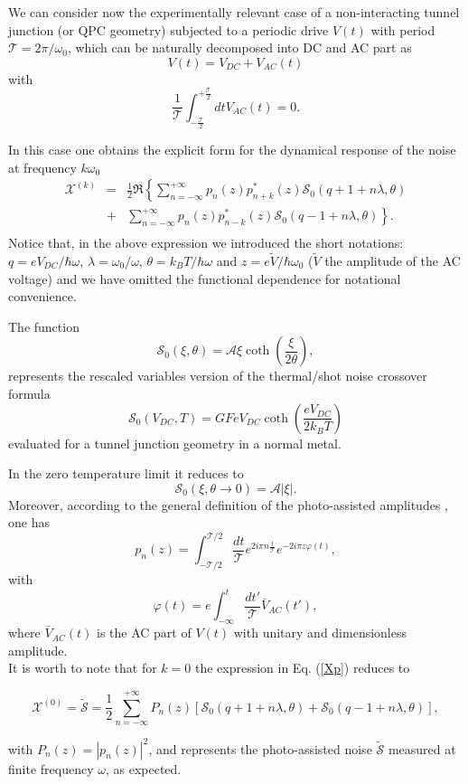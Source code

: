 \documentclass[twocolumn,showpacs,preprintnumbers,amsmath,amssymb%
 aps,
 prb,
 lengthcheck,%
]{revtex4-1}
\def\be{\begin{equation}}
\def\ee{\end{equation}}
\def\beq{\begin{eqnarray}}
\def\eeq{\end{eqnarray}}
\begin{document}
We can consider now the experimentally relevant case of a non-interacting tunnel junction (or QPC geometry) subjected to a periodic drive $V(t)$ with period $\mathcal{T}=2 \pi /\omega_{0}$, which can be naturally decomposed into DC and AC part as 
\be
V(t)=V_{DC}+V_{AC}(t)
\ee
with 
\begin{equation}
\frac{1}{\mathcal{T}}\int^{+\frac{\mathcal{T}}{2}}_{-\frac{\mathcal{T}}{2}} dt V_{AC}(t)=0.
\end{equation}

In this case one obtains the explicit form for the dynamical response of the noise at frequency $k \omega_{0}$ 
\beq
\mathcal{X}^{(k)}&=&\frac{1}{2} \Re\left\{\sum_{n=-\infty}^{+\infty} p_{n}(z) p^{*}_{n+k}(z) \mathcal{S}_{0}(q+1+n\lambda, \theta) \right.\nonumber\\
&+&\left.  \sum_{n=-\infty}^{+\infty} p_{n}(z) p^{*}_{n-k}(z) \mathcal{S}_{0}(q-1+n\lambda, \theta)  \right\}.\nonumber\\
\label{Xp_extended}
\eeq
Notice that, in the above expression we introduced the short notations: $q=e V_{DC}/\hbar \omega$, $\lambda=\omega_{0}/\omega$, $\theta=k_{B}T/\hbar \omega$ and $z=e \tilde{V}/\hbar \omega_{0}$ ($\tilde{V}$ the amplitude of the AC voltage) and we have omitted the functional dependence for notational convenience. 

The function  
\be
\mathcal{S}_{0}(\xi, \theta)= \mathcal{A} \xi \coth \left(\frac{\xi}{2 \theta} \right),
\label{Szero}
\ee 
represents the rescaled variables version of the thermal/shot noise crossover formula 
\be
\mathcal{S}_{0}(V_{DC}, T)= G F e V_{DC} \coth \left(\frac{e V_{DC}}{2 k_{B} T} \right)
\ee
evaluated for a tunnel junction geometry in a normal metal.\cite{blanter_shot_2000, martin_noise_2005}

 In the zero temperature limit it reduces to  
\be
\mathcal{S}_{0}(\xi, \theta \rightarrow 0)= \mathcal{A} |\xi|.
\ee
Moreover, according to the general definition of the photo-assisted amplitudes \cite{crepieux_photoassisted_2004, dubois_integer_2013}, one has
\begin{equation}
p_{n}(z) = \int_{-\mathcal{T}/2}^{\mathcal{T}/2} \frac{dt}{\mathcal{T}} e^{2 i \pi  n \frac{t}{\mathcal{T}}} e^{- 2 i\pi  z  \varphi(t)}, 
\label{eq:defpofl}
\end{equation}
with 
\be
\varphi (t) = e \int_{-\infty}^t \frac{dt'}{\mathcal{T}}\bar{V}_{AC}(t'),
\ee
where $\bar{V}_{AC}(t)$ is the AC part of $V(t)$ with unitary and dimensionless amplitude.\\
It is worth to note that for $k=0$ the expression in Eq. (\ref{Xp}) reduces to
\begin{widetext}
\be
\mathcal{X}^{(0)}=\tilde{\mathcal{S}}=\frac{1}{2} \sum_{n=-\infty}^{+\infty}P_{n}(z) \left[\mathcal{S}_{0}(q+1+n\lambda, \theta)+ \mathcal{S}_{0}(q-1+n\lambda, \theta)\right],
\label{S_tilde}
\ee
\end{widetext}
with $P_{n}(z)=|p_{n}(z)|^{2}$, and represents the photo-assisted noise $\tilde{\mathcal{S}}$ measured at finite frequency $\omega$, as expected.
\end{document}
